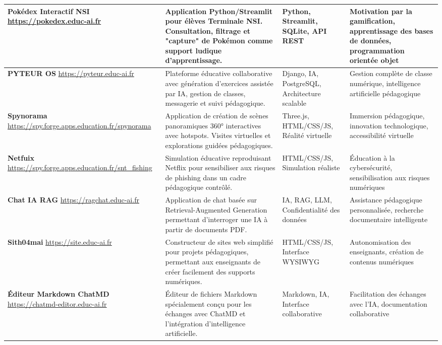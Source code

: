 \begin{longtable}{|p{3cm}|p{4cm}|p{4cm}|p{3cm}|}
\textbf{Pokédex Interactif NSI} \newline
\url{https://pokedex.educ-ai.fr} & 
Application Python/Streamlit pour élèves Terminale NSI. Consultation, filtrage et "capture" de Pokémon comme support ludique d'apprentissage. & 
Python, Streamlit, SQLite, API REST & 
Motivation par la gamification, apprentissage des bases de données, programmation orientée objet \\
\hline

\textbf{PYTEUR OS} \newline
\url{https://pyteur.educ-ai.fr} & 
Plateforme éducative collaborative avec génération d'exercices assistée par IA, gestion de classes, messagerie et suivi pédagogique. & 
Django, IA, PostgreSQL, Architecture scalable & 
Gestion complète de classe numérique, intelligence artificielle pédagogique \\
\hline

\textbf{Spynorama} \newline
\url{https://spy.forge.apps.education.fr/spynorama} & 
Application de création de scènes panoramiques 360° interactives avec hotspots. Visites virtuelles et explorations guidées pédagogiques. & 
Three.js, HTML/CSS/JS, Réalité virtuelle & 
Immersion pédagogique, innovation technologique, accessibilité virtuelle \\
\hline

\textbf{Netfuix} \newline
\url{https://spy.forge.apps.education.fr/snt_fishing} & 
Simulation éducative reproduisant Netflix pour sensibiliser aux risques de phishing dans un cadre pédagogique contrôlé. & 
HTML/CSS/JS, Simulation réaliste & 
Éducation à la cybersécurité, sensibilisation aux risques numériques \\
\hline

\textbf{Chat IA RAG} \newline
\url{https://ragchat.educ-ai.fr} & 
Application de chat basée sur Retrieval-Augmented Generation permettant d'interroger une IA à partir de documents PDF. & 
IA, RAG, LLM, Confidentialité des données & 
Assistance pédagogique personnalisée, recherche documentaire intelligente \\
\hline

\textbf{Sith04mai} \newline
\url{https://site.educ-ai.fr} & 
Constructeur de sites web simplifié pour projets pédagogiques, permettant aux enseignants de créer facilement des supports numériques. & 
HTML/CSS/JS, Interface WYSIWYG & 
Autonomisation des enseignants, création de contenus numériques \\
\hline

\textbf{Éditeur Markdown ChatMD} \newline
\url{https://chatmd-editor.educ-ai.fr} & 
Éditeur de fichiers Markdown spécialement conçu pour les échanges avec ChatMD et l'intégration d'intelligence artificielle. & 
Markdown, IA, Interface collaborative & 
Facilitation des échanges avec l'IA, documentation collaborative \\
\hline

\end{longtable}


